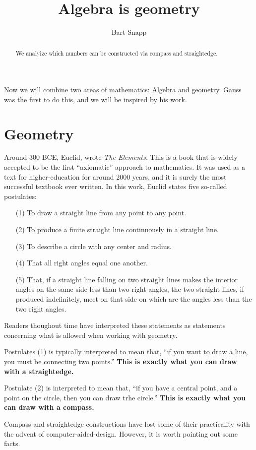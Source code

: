 \documentclass{ximera}
\author{Bart Snapp}
\title{Algebra is geometry}
\begin{document}
\begin{abstract}
  We analyize which numbers can be constructed via compass and
  straightedge.
\end{abstract}
\maketitle


Now we will combine two areas of mathematics: Algebra and
geometry. Gauss was the first to do this, and we will be inspired by
his work.

\section{Geometry}

Around 300 BCE, Euclid, wrote \textit{The Elements.} This is a book
that is widely accepted to be the first ``axiomatic'' approach to
mathematics. It was used as a text for higher-education for around
2000 years, and it is surely the most successful textbook ever
written. In this work, Euclid states five so-called postulates:
\begin{enumerate}
\item[(1)] To draw a straight line from any point to any point.
\item[(2)] To produce a finite straight line continuously in a straight line.
\item[(3)] To describe a circle with any center and radius.
\item[(4)] That all right angles equal one another.
\item[(5)] That, if a straight line falling on two straight lines makes the
  interior angles on the same side less than two right angles, the two
  straight lines, if produced indefinitely, meet on that side on which
  are the angles less than the two right angles.
\end{enumerate}
Readers thoughout time have interpreted these statements as statements
concerning what is allowed when working with geometry.

Postulates (1) is typically interpreted to mean that, ``if you want to
draw a line, you must be connecting two points.'' \textbf{This is exactly what
you can draw with a straightedge.}


Postulate (2) is interpreted to mean that, ``if you have a central
point, and a point on the circle, then you can draw trhe circle.''
\textbf{This is exactly what you can draw with a compass.}

Compass and straightedge constructions have lost some of their
practicality with the advent of computer-aided-design. However, it is
worth pointing out some facts.
\end{document}
